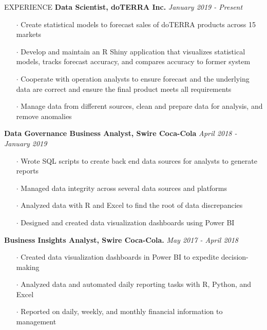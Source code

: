 \documentclass{resume} %
\begin{document}
    
      \begin{rSection}{EXPERIENCE}
    {\bf Data Scientist, doTERRA Inc.} \hfill {\textit{January 2019 - Present}}
    \begin{itemize}[noitemsep]
      \item[$\cdot$] Create statistical models to forecast sales of doTERRA products across 15 markets
      \item[$\cdot$] Develop and maintain an R Shiny application that visualizes  statistical models, tracks forecast \break accuracy, and compares accuracy to former system
      \item[$\cdot$] Cooperate with operation analysts to ensure forecast and the underlying data are correct and ensure the final product meets all requirements
      \item[$\cdot$] Manage data from different sources, clean and prepare data for analysis, and remove anomalies 
    \end{itemize}
    {\bf Data Governance Business Analyst, Swire Coca-Cola} \hfill {\textit{April 2018 - January 2019}}
    \begin{itemize}[noitemsep]
      \item[$\cdot$] Wrote SQL scripts to create back end data sources for analysts to generate reports
      \item[$\cdot$] Managed data integrity across several data sources and platforms
      \item[$\cdot$] Analyzed data with R and Excel to ﬁnd the root of data discrepancies
      \item[$\cdot$] Designed and created data visualization dashboards using Power BI
    \end{itemize}
    {\bf Business Insights Analyst, Swire Coca-Cola.} \hfill {\textit{May 2017 - April 2018} }
    \begin{itemize}[noitemsep]
      \item[$\cdot$] Created data visualization dashboards in Power BI to expedite decision-making
      \item[$\cdot$] Analyzed data and automated daily reporting tasks with R, Python, and Excel
      \item[$\cdot$] Reported on daily, weekly, and monthly ﬁnancial information to management
    \end{itemize}

\end{rSection}
\end{document}
